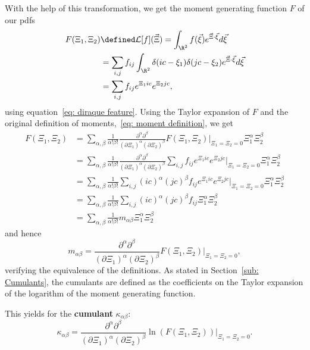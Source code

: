 With the help of this transformation, we get the moment generating function $F$ of our \glspl{pdf}
\begin{equation}
  \label{eq:Definition of F}
  \begin{aligned}
    F(\Xi_1, \Xi_2) & \defined \mathcal{L}[f](\vec{\Xi}) = \int_{\R^2} f(\vec{\xi}) e^{\vec{\Xi} \cdot \vec{\xi}}d\vec{\xi} \\
     & = \sum_{i,j}f_{ij} \int_{\R^2} \delta(ic - \xi_1)\delta(jc - \xi_2) e^{\vec{\Xi} \cdot \vec{\xi}}d\vec{\xi}
  \\
     & = \sum_{i,j}f_{ij} e^{\Xi_1 ic} e^{\Xi_2 jc},
  \end{aligned}
\end{equation}
using equation~\eqref{eq: diraque feature}.
Using the Taylor expansion of $F$ and the original definition of moments,~\eqref{eq: moment definition}, we get
\begin{equation}
  \label{eq: taylor of F}
  \begin{aligned}
    F(\Xi_1, \Xi_2) & = \sum_{\alpha,\beta} \frac{1}{\alpha!\beta!} \frac{\partial^\alpha\partial^\beta}{{(\partial \Xi_1)}^\alpha{(\partial \Xi_2)}^\beta} F(\Xi_1, \Xi_2)\Bigr|_{\Xi_1=\Xi_2 = 0} \Xi_1^\alpha \Xi_2^\beta \\
    & = \sum_{\alpha,\beta} \frac{1}{\alpha!\beta!} \frac{\partial^\alpha\partial^\beta}
      {{(\partial \Xi_1)}^\alpha{(\partial \Xi_2)}^\beta}  \sum_{i,j} f_{ij} e^{\Xi_1 ic} e^{\Xi_2 jc} \Bigr|_{\Xi_1=\Xi_2 = 0} \Xi_1^\alpha \Xi_2^\beta \\
    & = \sum_{\alpha,\beta} \frac{1}{\alpha!\beta!}
    \sum_{i,j}  {(ic)}^\alpha {(jc)}^\beta f_{ij} e^{\Xi_1 ic} e^{\Xi_2 jc} \Bigr|_{\Xi_1=\Xi_2 = 0} \Xi_1^\alpha \Xi_2^\beta \\
    & = \sum_{\alpha,\beta} \frac{1}{\alpha!\beta!}
    \sum_{i,j} {(ic)}^\alpha {(jc)}^\beta f_{ij} \Xi_1^\alpha \Xi_2^\beta \\
    & = \sum_{\alpha,\beta} \frac{1}{\alpha!\beta!} m_{\alpha\beta} \Xi_1^\alpha \Xi_2^\beta
  \end{aligned}
\end{equation}
and hence
\begin{equation}
  \label{eq: alternative representation of moments}
  m_{\alpha\beta} = \frac{\partial^\alpha\partial^\beta}{{(\partial \Xi_1)}^\alpha{(\partial \Xi_2)}^\beta} F(\Xi_1, \Xi_2)\Bigr|_{\Xi_1=\Xi_2 = 0},
\end{equation}
verifying the equivalence of the definitions.
As stated in Section~\ref{sub: Cumulants}, the cumulants are defined as the coefficients on the Taylor expansion of the logarithm of the moment generating function.

This yields for the \textbf{cumulant} $\kappa_{\alpha\beta}$:
\begin{equation}
  \label{eq: definition of cumulants}
  \kappa_{\alpha\beta} = \frac{\partial^\alpha\partial^\beta}{{(\partial \Xi_1)}^\alpha{(\partial \Xi_2)}^\beta} \ln(F(\Xi_1, \Xi_2))\Bigr|_{\Xi_1=\Xi_2 = 0}.
\end{equation}
